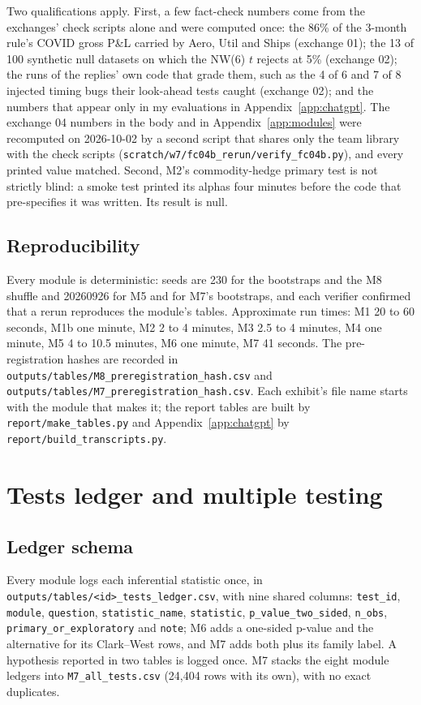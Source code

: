 Two qualifications apply. First, a few fact-check numbers come from the exchanges' check scripts alone and were computed once: the 86\% of the 3-month rule's COVID gross P\&L carried by Aero, Util and Ships (exchange 01); the 13 of 100 synthetic null datasets on which the NW(6) $t$ rejects at 5\% (exchange 02); the runs of the replies' own code that grade them, such as the 4 of 6 and 7 of 8 injected timing bugs their look-ahead tests caught (exchange 02); and the numbers that appear only in my evaluations in Appendix~\ref{app:chatgpt}. The exchange 04 numbers in the body and in Appendix~\ref{app:modules} were recomputed on 2026-10-02 by a second script that shares only the team library with the check scripts (\texttt{scratch/\allowbreak w7/\allowbreak fc04b\_rerun/\allowbreak verify\_fc04b.py}), and every printed value matched. Second, M2's commodity-hedge primary test is not strictly blind: a smoke test printed its alphas four minutes before the code that pre-specifies it was written. Its result is null.

\subsection{Reproducibility}
Every module is deterministic: seeds are 230 for the bootstraps and the M8 shuffle and 20260926 for M5 and for M7's bootstraps, and each verifier confirmed that a rerun reproduces the module's tables. Approximate run times: M1 20 to 60 seconds, M1b one minute, M2 2 to 4 minutes, M3 2.5 to 4 minutes, M4 one minute, M5 4 to 10.5 minutes, M6 one minute, M7 41 seconds. The pre-registration hashes are recorded in \texttt{outputs/tables/M8\_preregistration\_hash.csv} and \texttt{outputs/tables/M7\_preregistration\_hash.csv}. Each exhibit's file name starts with the module that makes it; the report tables are built by \texttt{report/make\_tables.py} and Appendix~\ref{app:chatgpt} by \texttt{report/build\_transcripts.py}.

\clearpage
\section{Tests ledger and multiple testing}
\label{app:ledger}

\subsection{Ledger schema}
{\raggedright Every module logs each inferential statistic once, in \texttt{outputs/tables/<id>\_tests\_ledger.csv}, with nine shared columns: \texttt{test\_id}, \texttt{module}, \texttt{question}, \texttt{statistic\_name}, \texttt{statistic}, \texttt{p\_value\_two\_sided}, \texttt{n\_obs}, \texttt{primary\_or\_exploratory} and \texttt{note}; M6 adds a one-sided p-value and the alternative for its Clark--West rows, and M7 adds both plus its family label. A hypothesis reported in two tables is logged once. M7 stacks the eight module ledgers into \texttt{M7\_all\_tests.csv} (24,404 rows with its own), with no exact duplicates.\par}

